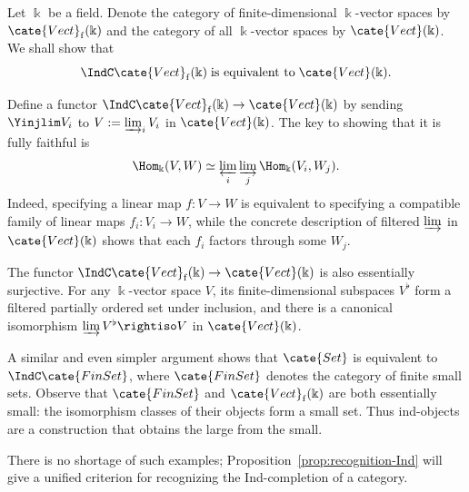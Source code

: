 \begin{example}\label{eg:Ind-Vect}
	Let $\Bbbk$ be a field. Denote the category of finite-dimensional $\Bbbk$-vector spaces by $\cate{Vect}_{\mathrm{f}}(\Bbbk)$ and the category of all $\Bbbk$-vector spaces by $\cate{Vect}(\Bbbk)$. We shall show that
	\[ \IndC \cate{Vect}_{\mathrm{f}}(\Bbbk) \;\text{is equivalent to}\; \cate{Vect}(\Bbbk). \]

	Define a functor $\IndC\cate{Vect}_{\mathrm{f}}(\Bbbk)\to\cate{Vect}(\Bbbk)$ by sending $\Yinjlim V_i$ to $V:=\varinjlim_iV_i$ in $\cate{Vect}(\Bbbk)$. The key to showing that it is fully faithful is
	\[ \Hom_{\Bbbk}(V, W) \simeq \varprojlim_i \varinjlim_j \Hom_{\Bbbk}(V_i, W_j). \]
	Indeed, specifying a linear map $f:V\to W$ is equivalent to specifying a compatible family of linear maps $f_i:V_i\to W$, while the concrete description of filtered $\varinjlim$ in $\cate{Vect}(\Bbbk)$ shows that each $f_i$ factors through some $W_j$.

	The functor $\IndC\cate{Vect}_{\mathrm{f}}(\Bbbk)\to\cate{Vect}(\Bbbk)$ is also essentially surjective. For any $\Bbbk$-vector space $V$, its finite-dimensional subspaces $V^\flat$ form a filtered partially ordered set under inclusion, and there is a canonical isomorphism
	$\varinjlim V^\flat\rightiso V$ in $\cate{Vect}(\Bbbk)$.
\end{example}

A similar and even simpler argument shows that $\cate{Set}$ is equivalent to $\IndC\cate{FinSet}$, where $\cate{FinSet}$ denotes the category of finite small sets. Observe that $\cate{FinSet}$ and $\cate{Vect}_{\mathrm{f}}(\Bbbk)$ are both essentially small: the isomorphism classes of their objects form a small set. Thus ind-objects are a construction that obtains the large from the small.

There is no shortage of such examples; Proposition~\ref{prop:recognition-Ind} will give a unified criterion for recognizing the Ind-completion of a category.

